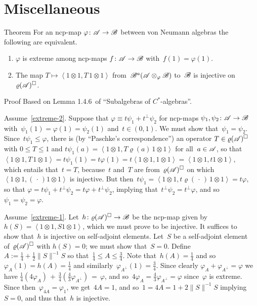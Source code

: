 \documentclass[a]{subfiles}
\begin{document}
\chapter{Miscellaneous}
\begin{parsec}%
\begin{point}{Theorem}%
For an ncp-map $\varphi\colon \mathscr{A}\to\mathscr{B}$ between von Neumann algebras
the following are equivalent.
\begin{enumerate}
\item
\label{extreme-1}
$\varphi$ is extreme among 
ncp-maps $f\colon \mathscr{A}\to\mathscr{B}$ with~$f(1)=\varphi(1)$.
\item
\label{extreme-2}
The map $T\mapsto \left< 1\otimes 1,T\,1\otimes 1\right>$
from~$\mathscr{B}^a(\mathscr{A}\otimes_\varphi\mathscr{B})$
to~$\mathscr{B}$ is injective on~$\varrho(\mathscr{A})^\square$.
\end{enumerate}
\begin{point}{Proof}%
Based on Lemma 1.4.6~of ``Subalgebras of $C^*$-algebras''.

Assume~\ref{extreme-2}.
Suppose that $\varphi\equiv t \psi_1+t^\perp \psi_2$
for ncp-maps $\psi_1,\psi_2\colon \mathscr{A}\to\mathscr{B}$
with~$\psi_1(1)=\varphi(1)=\psi_2(1)$
and~$t \in(0,1)$.
We must show that~$\psi_1=\psi_2$.
Since~$t \psi_1\leq \varphi$,
there is (by ``Paschke's correspondence'')
an operator $T\in \varrho(\mathscr{A})^\square$
with $0\leq T\leq 1$
and $t\psi_1(a)=\left<1\otimes 1,T \varrho(a)\, 1\otimes 1\right>$
for all~$a\in\mathscr{A}$,
so that $\left<1\otimes 1, T \,1\otimes 1\right>
= t\psi_1(1) = t\varphi(1)= t \left<1\otimes 1,1\otimes 1\right>
= \left<1\otimes 1, t1\otimes 1\right>$,
which entails that~$t=T$,
because~$t$ and~$T$ are from~$\varrho(\mathscr{A})^\square$
on which~$\left<1\otimes 1,(\,\cdot\,)1\otimes 1\right>$
is injective.
But then~$t\psi_1=\left<1\otimes 1,t \varrho(\,\cdot\,)\,1\otimes 1\right>
=t \varphi$,
so that $\varphi = t\psi_1+t^\perp \psi_2
= t \varphi+t^\perp\psi_2$,
implying that~$t^\perp \psi_2= t^\perp \varphi$,
and so~$\psi_1=\psi_2=\varphi$.

Assume~\ref{extreme-1}.
Let~$h\colon \varrho(\mathscr{A})^\square\to \mathscr{B}$
be the ncp-map given by~$h(S)=\left<1\otimes 1,S1\otimes 1\right>$,
which we must prove to be injective.
It suffices to show that~$h$ is injective on self-adjoint elements.
Let~$S$ be a self-adjoint element of~$\varrho(\mathscr{A})^\square$
with $h(S)=0$;
we must show that~$S=0$.
Define $A:=\frac{1}{4}+\frac{1}{2}\|S\|^{-1}S$
so that~$\frac{1}{4}\leq A\leq \frac{3}{4}$.
Note that~$h(A)=\frac{1}{4}$ and
so $\varphi_A(1)=h(A)=\frac{1}{4}$
and similarly~$\varphi_{A^\perp}(1)=\frac{3}{4}$.
Since clearly
$\varphi_A+\varphi_{A^\perp} = \varphi$
we have $\frac{1}{4}(4\varphi_A)\,+\,\frac{3}{4}(\frac{4}{3}\varphi_{A^\perp})
\,=\,\varphi$,
and so~$4\varphi_A=\frac{4}{3}\varphi_{A^\perp}=\varphi$
since~$\varphi$ is extreme.
Since then~$\varphi_{4A}=\varphi_{1}$, we get~$4A=1$,
and so~$1=4A=1+2\|S\|^{-1}S$
implying~$S=0$,
and thus that~$h$ is injective.
\end{point}

\end{point}
\end{parsec}
\end{document}
